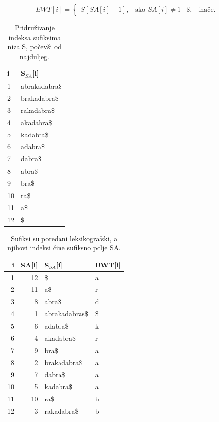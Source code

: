 \documentclass[11pt]{article}
\begin{document}
\[
BWT[i]=\begin{cases}
S[SA[i]-1], & \text{ako } SA[i]\neq 1 & 
\$, & \text{inače}.
\end{cases}
\]
 
 
\begin{table}
	\caption{Pridruživanje indeksa sufiksima niza S, počevši od najduljeg.}
	\label{tablePrimjer1}
	\begin{center}
		\begin{tabular}{ll}
			\toprule
			i & S$_{SA}$[i] \\
			\midrule
			1 & abrakadabra\$ \\
			2 & brakadabra\$ \\
			3 & rakadabra\$ \\
			4 & akadabra\$ \\
			5 & kadabra\$ \\
			6 & adabra\$ \\
			7 & dabra\$ \\
			8 & abra\$ \\
			9 & bra\$ \\
			10 & ra\$ \\
			11 & a\$ \\
			12 & \$ \\
			\bottomrule
		\end{tabular}
	\end{center}
\end{table}

\begin{table}
	\caption{Sufiksi su poredani leksikografski, a njihovi indeksi čine sufiksno polje SA.}
	\label{tablePrimjer2}
	\begin{center}
		\begin{tabular}{rrll}
			\toprule
			i & SA[i] & S$_{SA}$[i] & BWT[i] \\
			\midrule
			1 & 12 & \$ & a\\
			2 & 11 &  a\$ & r \\
			3 & 8 & abra\$ & d \\
			4 & 1 & abrakadabras\$ & \$ \\
			5 & 6 & adabra\$ & k \\
			6 & 4 & akadabra\$ & r \\
			7 & 9 & bra\$ & a\\
			8 & 2 & brakadabra\$ & a\\
			9 & 7 & dabra\$ & a \\
			10 & 5 & kadabra\$ & a\\
			11 & 10 & ra\$ & b \\
			12 & 3 & rakadabra\$ & b\\
			\bottomrule
		\end{tabular}
		
	\end{center}
	
\end{table}
\end{document}
